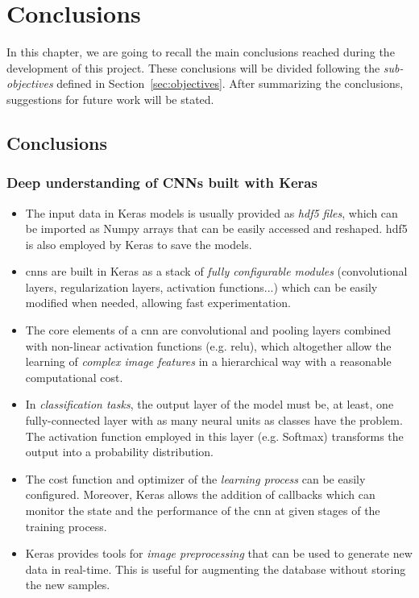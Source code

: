 \chapter{Conclusions}\label{ch:conclusions}
In this chapter, we are going to recall the main conclusions reached during the development of this project. These conclusions will be divided following the \emph{sub-objectives} defined in Section~\ref{sec:objectives}. After summarizing the conclusions, suggestions for future work will be stated.

\section{Conclusions}
\subsection*{Deep understanding of CNNs built with Keras}
\begin{itemize}
	\item The input data in Keras models is usually provided as \emph{\gls{hdf5} files}, which can be imported as Numpy arrays that can be easily accessed and reshaped. \gls{hdf5} is also employed by Keras to save the models.
	\item \glspl{cnn} are built in Keras as a stack of \emph{fully configurable modules} (convolutional layers, regularization layers, activation functions...) which can be easily modified when needed, allowing fast experimentation.
	\item The core elements of a \gls{cnn} are convolutional and pooling layers combined with non-linear activation functions (e.g. \gls{relu}), which altogether allow the learning of \emph{complex image features} in a hierarchical way with a reasonable computational cost.
	\item In \emph{classification tasks}, the output layer of the model must be, at least, one fully-connected layer with as many neural units as classes have the problem. The activation function employed in this layer (e.g. Softmax) transforms the output into a probability distribution.
	\item The cost function and optimizer of the \emph{learning process} can be easily configured. Moreover, Keras allows the addition of callbacks which can monitor the state and the performance of the \gls{cnn} at given stages of the training process.
	\item Keras provides tools for \emph{image preprocessing} that can be used to generate new data in real-time. This is useful for augmenting the database without storing the new samples.
\end{itemize}

